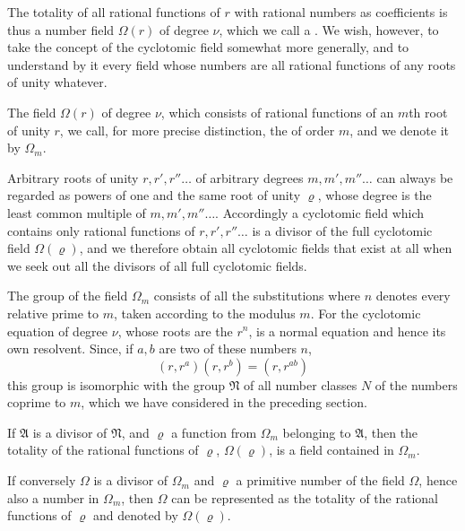 The totality of all rational functions of $r$ with rational numbers as coefficients is thus a number field $\Omega(r)$ of degree $\nu$, which we call a . We wish, however, to take the concept of the cyclotomic field somewhat more generally, and to understand by it every field whose numbers are all rational functions of any roots of unity whatever.

The field $\Omega(r)$ of degree $\nu$, which consists of  rational functions of an $m$th root of unity $r$, we call, for more precise distinction, the  of order $m$, and we denote it by $\Omega_m$.

Arbitrary roots of unity $r, r', r'' \ldots$ of arbitrary degrees $m, m', m'' \ldots$ can always be regarded as powers of one and the same root of unity $\varrho$, whose degree is the least common multiple of $m, m', m'' \ldots$. Accordingly a cyclotomic field which contains only rational functions of $r, r', r'' \ldots$ is a divisor of the full cyclotomic field $\Omega(\varrho)$, and we therefore obtain all cyclotomic fields that exist at all when we seek out all the divisors of all full cyclotomic fields.

The  group of the field $\Omega_m$ consists of all the substitutions
where $n$ denotes every relative prime to $m$, taken according to the modulus $m$. For the cyclotomic equation of degree $\nu$, whose roots are the $r^n$, is a normal equation and hence its own  resolvent. Since, if $a, b$ are two of these numbers $n$,
\[
(r, r^a)(r, r^b) = (r, r^{ab})
\]
this group is isomorphic with the group $\mathfrak{N}$ of all number classes $N$ of the numbers coprime to $m$, which we have considered in the preceding section.

If $\mathfrak{A}$ is a divisor of $\mathfrak{N}$, and $\varrho$ a function from $\Omega_m$ belonging to $\mathfrak{A}$, then the totality of the rational functions of $\varrho$, $\Omega(\varrho)$, is a field contained in $\Omega_m$.

If conversely $\Omega$ is a divisor of $\Omega_m$ and $\varrho$ a primitive number of the field $\Omega$, hence also a number in $\Omega_m$, then $\Omega$ can be represented as the totality of the rational functions of $\varrho$ and denoted by $\Omega(\varrho)$.
